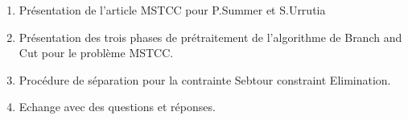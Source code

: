 \begin{enumerate}
    \item Présentation de l'article MSTCC pour P.Summer et S.Urrutia 
    \item Présentation des trois phases de prétraitement de l'algorithme de Branch and Cut pour le problème MSTCC.
    \item Procédure de séparation pour la contrainte Sebtour constraint Elimination.
    \item Echange avec des questions et réponses.
    

\end{enumerate}